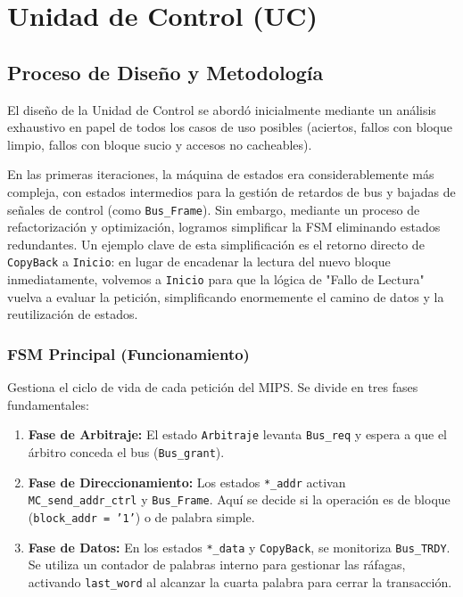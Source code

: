 \documentclass[12pt,a4paper]{article}
\begin{document}
\section{Unidad de Control (UC)}

\subsection{Proceso de Diseño y Metodología}
El diseño de la Unidad de Control se abordó inicialmente mediante un análisis exhaustivo en papel de todos los casos de uso posibles (aciertos, fallos con bloque limpio, fallos con bloque sucio y accesos no cacheables). 

En las primeras iteraciones, la máquina de estados era considerablemente más compleja, con estados intermedios para la gestión de retardos de bus y bajadas de señales de control (como \texttt{Bus\_Frame}). Sin embargo, mediante un proceso de refactorización y optimización, logramos simplificar la FSM eliminando estados redundantes. Un ejemplo clave de esta simplificación es el retorno directo de \texttt{CopyBack} a \texttt{Inicio}: en lugar de encadenar la lectura del nuevo bloque inmediatamente, volvemos a \texttt{Inicio} para que la lógica de "Fallo de Lectura" vuelva a evaluar la petición, simplificando enormemente el camino de datos y la reutilización de estados.

\subsubsection{FSM Principal (Funcionamiento)}
Gestiona el ciclo de vida de cada petición del MIPS. Se divide en tres fases fundamentales:
\begin{enumerate}
    \item \textbf{Fase de Arbitraje:} El estado \texttt{Arbitraje} levanta \texttt{Bus\_req} y espera a que el árbitro conceda el bus (\texttt{Bus\_grant}).
    \item \textbf{Fase de Direccionamiento:} Los estados \texttt{*\_addr} activan \texttt{MC\_send\_addr\_ctrl} y \texttt{Bus\_Frame}. Aquí se decide si la operación es de bloque (\texttt{block\_addr = '1'}) o de palabra simple.
    \item \textbf{Fase de Datos:} En los estados \texttt{*\_data} y \texttt{CopyBack}, se monitoriza \texttt{Bus\_TRDY}. Se utiliza un contador de palabras interno para gestionar las ráfagas, activando \texttt{last\_word} al alcanzar la cuarta palabra para cerrar la transacción.
\end{enumerate}
\end{document}
